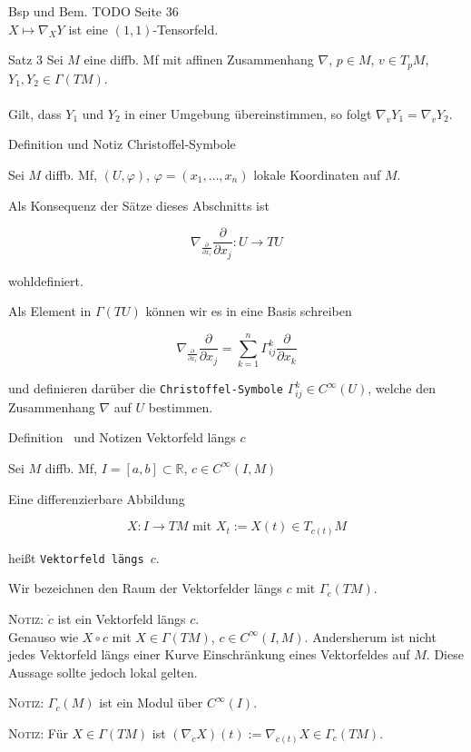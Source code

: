 \documentclass[a6paper,11pt,grid=front]{kartei}
\newcommand{\fl}[1]{\begin{flushleft}
 #1 \end{flushleft}}
\newcommand{\R}{\mathbb{R}}
\newcommand{\pd}[1][x_i]{\frac{\partial}{\partial {#1}}}
\newcounter{def}
\newcounter{satz}
\newcommand{\defreset}{\setcounter{def}{1}}
\newcommand{\satzreset}{\setcounter{satz}{1}}
\newcommand{\thisdef}{\thedef\ \stepcounter{def}}
\begin{document}
\nonameyet
{Bsp und Bem.} {}
{
TODO Seite 36
\\
$X\mapsto \nabla_X Y$ ist eine $(1,1)$-Tensorfeld.
}
{}

\nonameyet
{Satz 3} {}
{
Sei $M$ eine diffb. Mf mit affinen Zusammenhang $\nabla$, $p\in M$, $v\in T_pM$,
$Y_1,Y_2 \in \Gamma(TM)$.
\\
~\\
Gilt, dass  $Y_1$ und $Y_2$ in einer Umgebung übereinstimmen, so folgt 
$\nabla_v Y_1 = \nabla_v Y_2$.
}
{}

\nonameyet
{Definition und Notiz} {Christoffel-Symbole}
{
\small
Sei $M$ diffb. Mf, $(U,\varphi)$, $\varphi = (x_1,\dots,x_n)$ lokale
Koordinaten auf $M$.

\fl{Als Konsequenz der Sätze dieses Abschnitts ist}
\[
\nabla_{\pd} \pd[x_j] : U \to TU
\]
\fl{wohldefiniert.}
%
\fl{Als Element in $\Gamma(TU)$ können wir es in eine Basis schreiben }
\[
\nabla_{\pd} \pd[x_j] = \sum_{k=1}^n \Gamma^k_{ij} \pd[x_k]
\]
\fl{und definieren darüber die \texttt{Christoffel-Symbole} 
$\Gamma^k_{ij} \in C^\infty(U)$, welche den Zusammenhang $\nabla$ auf 
$U$ bestimmen.}
}
{}
\defreset
\satzreset

\nonameyet
{\small Definition \thisdef und Notizen} {\small Vektorfeld längs $c$}
{
\small
Sei $M$ diffb. Mf, $I = [a,b] \subset \R$, $c\in C^\infty(I,M)$
\fl{Eine differenzierbare Abbildung  }
\[
X: I \to TM \text{ mit } X_t := X(t)\in T_{c(t)}M
\]
\fl{heißt \texttt{Vektorfeld längs $c$}.}
\fl{Wir bezeichnen den Raum der Vektorfelder längs $c$ mit $\Gamma_c(TM)$.}

\fl{\textsc{Notiz:} $\dot c$ ist ein Vektorfeld längs $c$. \\
Genauso wie $X\circ c$ mit $X\in\Gamma(TM)$, $c\in C^\infty(I,M)$.
Andersherum ist nicht jedes Vektorfeld längs einer Kurve Einschränkung
eines Vektorfeldes auf $M$. Diese Aussage sollte jedoch lokal gelten.
}
\fl{\textsc{Notiz:} $\Gamma_c(M)$ ist ein Modul über $C^\infty(I)$.}
\fl{\textsc{Notiz:} Für $X \in \Gamma(TM)$ ist 
$(\nabla_{\dot c} X)(t) := \nabla_{\dot c(t)} X \in \Gamma_c(TM)$.}
}
{}

\newcommand{\nabladt}[1][t]{\frac{\nabla}{d#1}}
\end{document}
